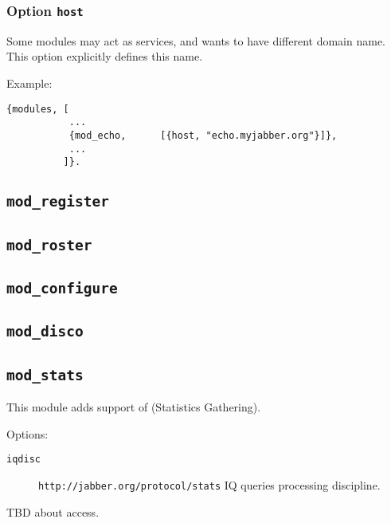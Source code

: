 \documentclass[10pt]{article}
\newcommand{\ns}[1]{\texttt{#1}}
\newcommand{\modregister}{\texttt{mod\_register}}
\newcommand{\modroster}{\texttt{mod\_roster}}
\newcommand{\modconfigure}{\texttt{mod\_configure}}
\newcommand{\moddisco}{\texttt{mod\_disco}}
\newcommand{\modstats}{\texttt{mod\_stats}}
\begin{document}
\subsubsection{Option \texttt{host}}

Some modules may act as services, and wants to have different domain name.
This option explicitly defines this name.

Example:
\begin{verbatim}
{modules, [
           ...
           {mod_echo,      [{host, "echo.myjabber.org"}]},
           ...
          ]}.
\end{verbatim}



\subsection{\modregister{}}
\label{sec:modregister}



\subsection{\modroster{}}
\label{sec:modroster}



\subsection{\modconfigure{}}
\label{sec:modconfigure}



\subsection{\moddisco{}}
\label{sec:moddisco}



\subsection{\modstats{}}
\label{sec:modstats}

This module adds support of
 (Statistics Gathering).

Options:
\begin{description}
\item[\texttt{iqdisc}] \ns{http://jabber.org/protocol/stats} IQ queries
  processing discipline.
\end{description}

TBD about access.
\end{document}

